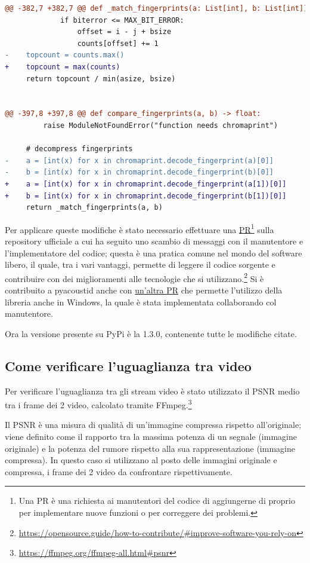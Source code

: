 \begin{lstlisting}[language=diff]
@@ -382,7 +382,7 @@ def _match_fingerprints(a: List[int], b: List[int]) -> float:       
             if biterror <= MAX_BIT_ERROR:
                 offset = i - j + bsize
                 counts[offset] += 1
-    topcount = counts.max()
+    topcount = max(counts)
     return topcount / min(asize, bsize)


@@ -397,8 +397,8 @@ def compare_fingerprints(a, b) -> float:
         raise ModuleNotFoundError("function needs chromaprint")

     # decompress fingerprints
-    a = [int(x) for x in chromaprint.decode_fingerprint(a)[0]]
-    b = [int(x) for x in chromaprint.decode_fingerprint(b)[0]]
+    a = [int(x) for x in chromaprint.decode_fingerprint(a[1])[0]]
+    b = [int(x) for x in chromaprint.decode_fingerprint(b[1])[0]]
     return _match_fingerprints(a, b)
\end{lstlisting}

Per applicare queste modifiche è stato necessario effettuare una \href{https://github.com/beetbox/pyacoustid/pull/78}{\ac{PR}}\footnote{Una \ac{PR} è una richiesta ai manutentori del codice di aggiungerne di proprio per implementare nuove funzioni o per correggere dei problemi.} sulla repository ufficiale a cui ha seguito uno scambio di messaggi con il manutentore e l'implementatore del codice; questa è una pratica comune nel mondo del software libero, il quale, tra i vari vantaggi, permette di leggere il codice sorgente e contribuire con dei miglioramenti alle tecnologie che si utilizzano.\footnote{\url{https://opensource.guide/how-to-contribute/\#improve-software-you-rely-on}}
Si è contribuito a pyacoustid anche con \href{https://github.com/beetbox/pyacoustid/pull/79}{un'altra \ac{PR}} che permette l'utilizzo della libreria anche in Windows, la quale è stata implementata collaborando col manutentore.

Ora la versione presente su PyPi è la 1.3.0, contenente tutte le modifiche citate.


\subsection{Come verificare l'uguaglianza tra video} \label{ssec:packager-video}    %
Per verificare l'uguaglianza tra gli stream video è stato utilizzato il \ac{PSNR} medio tra i frame dei 2 video, calcolato tramite FFmpeg.\footnote{\url{https://ffmpeg.org/ffmpeg-all.html\#psnr}}

Il \ac{PSNR} è una misura di qualità di un'immagine compressa rispetto all'originale; viene definito come il rapporto tra la massima potenza di un segnale (immagine originale) e la potenza del rumore rispetto alla sua rappresentazione (immagine compressa).
In questo caso si utilizzano al posto delle immagini originale e compressa, i frame dei 2 video da confrontare rispettivamente.

